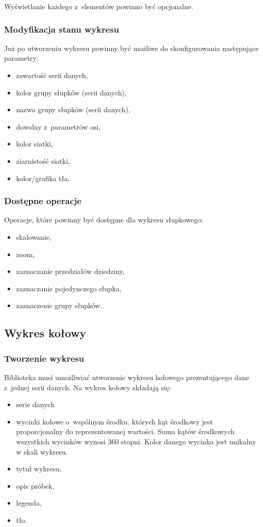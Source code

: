 \documentclass[11pt,twoside,a4paper,final]{article}
\begin{document}
Wyświetlanie każdego z~elementów powinno być opcjonalne. 
\subsubsection{Modyfikacja stanu wykresu}
Już po utworzeniu wykresu powinny być możliwe do skonfigurowania następujące parametry:
\begin{itemize}
\item{zawartość serii danych,}
\item{kolor grupy słupków (serii danych),}
\item{nazwa grupy słupków (serii danych),}
\item{dowolny z~parametrów osi,}
\item{kolor siatki,}
\item{ziarnistość siatki,}
\item{kolor/grafika tła.}
\end{itemize}

\subsubsection{Dostępne operacje}
Operacje, które powinny być dostępne dla wykresu słupkowego:
\begin{itemize}
\item{skalowanie,}
\item{zoom,}
\item{zaznaczanie przedziałów dziedziny,}
\item{zaznaczanie pojedynczego słupka,}
\item{zaznaczenie grupy słupków.}
\end{itemize}


\subsection{Wykres kołowy}
\subsubsection{Tworzenie wykresu}
Biblioteka musi umożliwiać utworzenie wykresu kołowego prezentującego dane z~jednej serii danych. Na wykres kołowy składają się:
\begin{itemize}
\item{serie danych}
\item{wycinki kołowe o~wspólnym środku, których kąt środkowy jest proporcjonalny do reprezentowanej wartości. Suma kątów środkowych wszystkich wycinków wynosi 360 stopni. Kolor danego wycinka jest unikalny w skali wykresu.}
\item{tytuł wykresu,}
\item{opis próbek,}
\item{legenda,}
\item{tło.}
\end{itemize}
\end{document}
